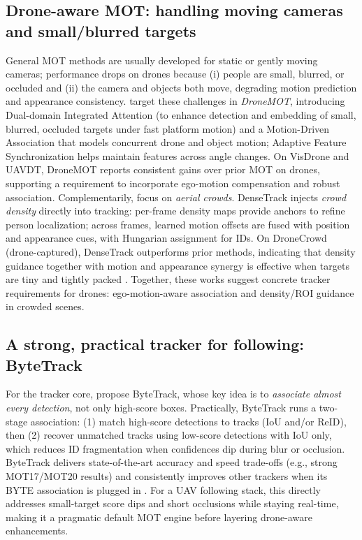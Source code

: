 \documentclass[12pt,a4paper]{report}
\begin{document}
\subsection*{Drone-aware \ac{MOT}: handling moving cameras and small/blurred targets}
General \ac{MOT} methods are usually developed for static or gently moving cameras; performance drops on drones because (i) people are small, blurred, or occluded and (ii) the camera and objects both move, degrading motion prediction and appearance consistency. \citet{Wang2024DroneMOT} target these challenges in \emph{DroneMOT}, introducing Dual-domain Integrated Attention (to enhance detection and embedding of small, blurred, occluded targets under fast platform motion) and a Motion-Driven Association that models concurrent drone and object motion; Adaptive Feature Synchronization helps maintain features across angle changes. On VisDrone and \ac{UAVDT}, DroneMOT reports consistent gains over prior \ac{MOT} on drones, supporting a requirement to incorporate ego-motion compensation and robust association.
Complementarily, \citep{Lei2024DenseTrack} focus on \emph{aerial crowds}. DenseTrack injects \emph{crowd density} directly into tracking: per-frame density maps provide anchors to refine person localization; across frames, learned motion offsets are fused with position and appearance cues, with Hungarian assignment for \ac{ID}s. On DroneCrowd (drone-captured), DenseTrack outperforms prior methods, indicating that density guidance together with motion and appearance synergy is effective when targets are tiny and tightly packed \citep{Lei2024DenseTrack}. Together, these works suggest concrete tracker requirements for drones: ego-motion-aware association and density/\ac{ROI} guidance in crowded scenes.

\subsection*{A strong, practical tracker for following: ByteTrack}
For the tracker core, \citep{Zhang2022ByteTrack} propose ByteTrack, whose key idea is to \emph{associate almost every detection}, not only high-score boxes. Practically, ByteTrack runs a two-stage association: (1) match high-score detections to tracks (\ac{IoU} and/or \ac{ReID}), then (2) recover unmatched tracks using low-score detections with \ac{IoU} only, which reduces \ac{ID} fragmentation when confidences dip during blur or occlusion. ByteTrack delivers state-of-the-art accuracy and speed trade-offs (e.g., strong MOT17/MOT20 results) and consistently improves other trackers when its BYTE association is plugged in \citep{Zhang2022ByteTrack}. For a \ac{UAV} following stack, this directly addresses small-target score dips and short occlusions while staying real-time, making it a pragmatic default \ac{MOT} engine before layering drone-aware enhancements.
\end{document}
